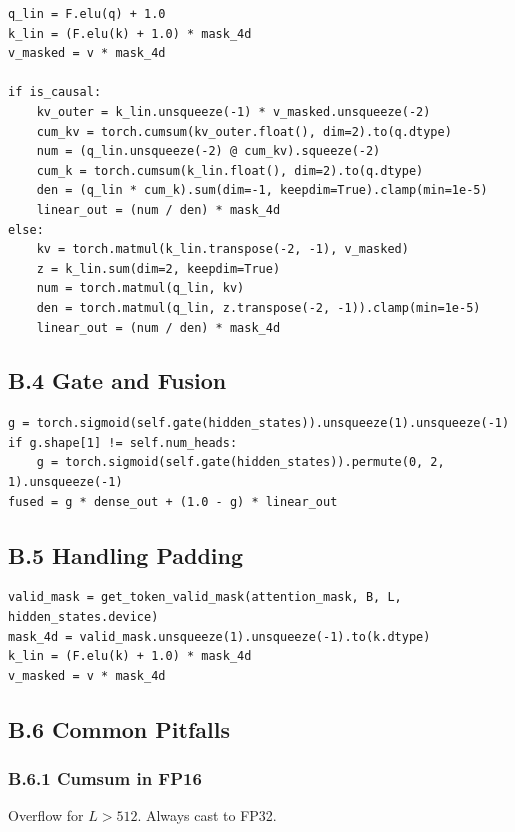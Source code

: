 \begin{lstlisting}
q_lin = F.elu(q) + 1.0
k_lin = (F.elu(k) + 1.0) * mask_4d
v_masked = v * mask_4d

if is_causal:
    kv_outer = k_lin.unsqueeze(-1) * v_masked.unsqueeze(-2)
    cum_kv = torch.cumsum(kv_outer.float(), dim=2).to(q.dtype)
    num = (q_lin.unsqueeze(-2) @ cum_kv).squeeze(-2)
    cum_k = torch.cumsum(k_lin.float(), dim=2).to(q.dtype)
    den = (q_lin * cum_k).sum(dim=-1, keepdim=True).clamp(min=1e-5)
    linear_out = (num / den) * mask_4d
else:
    kv = torch.matmul(k_lin.transpose(-2, -1), v_masked)
    z = k_lin.sum(dim=2, keepdim=True)
    num = torch.matmul(q_lin, kv)
    den = torch.matmul(q_lin, z.transpose(-2, -1)).clamp(min=1e-5)
    linear_out = (num / den) * mask_4d
\end{lstlisting}

\subsection{B.4 Gate and Fusion}

\begin{lstlisting}
g = torch.sigmoid(self.gate(hidden_states)).unsqueeze(1).unsqueeze(-1)
if g.shape[1] != self.num_heads:
    g = torch.sigmoid(self.gate(hidden_states)).permute(0, 2, 1).unsqueeze(-1)
fused = g * dense_out + (1.0 - g) * linear_out
\end{lstlisting}

\subsection{B.5 Handling Padding}

\begin{lstlisting}
valid_mask = get_token_valid_mask(attention_mask, B, L, hidden_states.device)
mask_4d = valid_mask.unsqueeze(1).unsqueeze(-1).to(k.dtype)
k_lin = (F.elu(k) + 1.0) * mask_4d
v_masked = v * mask_4d
\end{lstlisting}

\subsection{B.6 Common Pitfalls}

\subsubsection{B.6.1 Cumsum in FP16}

Overflow for $L > 512$. Always cast to FP32.

